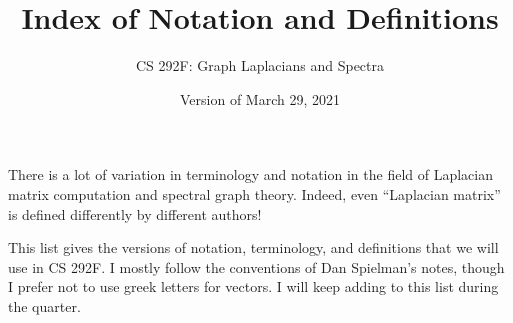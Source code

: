 \documentclass[11pt]{article}
\begin{document}
\title{Index of Notation and Definitions}
\author{CS 292F: Graph Laplacians and Spectra}
\date{Version of March 29, 2021}
\maketitle

There is a lot of variation in terminology and notation in
the field of Laplacian matrix computation and spectral graph 
theory.  
Indeed, even ``Laplacian matrix'' is defined differently by
different authors!

This list gives the versions of notation, terminology, and definitions 
that we will use in CS 292F.
I mostly follow the conventions of Dan Spielman's notes, 
though I prefer not to use greek letters for vectors.
I will keep adding to this list during the quarter.
\end{document}

